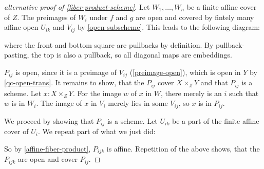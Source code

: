 \begin{proof}[alternative proof of \cref{fiber-product-scheme}]
  Let $W_1,\dots,W_n$ be a finite affine cover of $Z$.
  The preimages of $W_i$ under $f$ and $g$ are open
  and covered by fintely many affine open $U_{ik}$ and $V_{ij}$ by \cref{open-subscheme}.
  This leads to the following diagram:
  \begin{center}
  \end{center}
  where the front and bottom square are pullbacks by definition.
  By pullback-pasting, the top is also a pullback,
  so all diagonal maps are embeddings.
  
  $P_{ij}$ is open, since it is a preimage of $V_{ij}$ (\cref{preimage-open}),
  which is open in $Y$ by \cref{qc-open-trans}.
  It remains to show, that the $P_{ij}$ cover $X\times_Z Y$ and that $P_{ij}$ is a scheme.
  Let $x:X\times_Z Y$.
  For the image $w$ of $x$ in $W$, there merely is an $i$ such that $w$ is in $W_i$.
  The image of $x$ in $V_i$ merely lies in some $V_{ij}$,
  so $x$ is in $P_{ij}$.

  We proceed by showing that $P_{ij}$ is a scheme.
  Let $U_{ik}$ be a part of the finite affine cover of $U_i$.
  We repeat part of what we just did:
  \begin{center}
  \end{center}

  So by \cref{affine-fiber-product}, $P_{ijk}$ is affine.
  Repetition of the above shows, that the $P_{ijk}$ are open and cover $P_{ij}$.
\end{proof}

